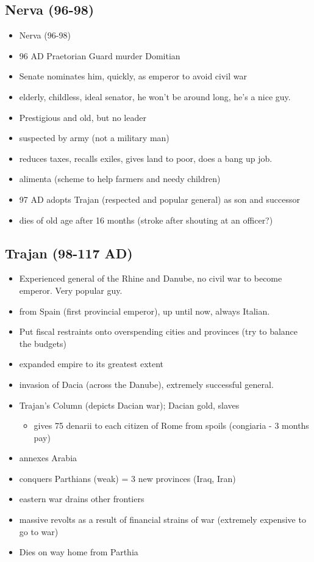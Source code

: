 \documentclass[12pt, twoside]{article}
\begin{document}
\subsection{Nerva (96-98)}
\begin{itemize}
\item Nerva (96-98)
\item 96 AD Praetorian Guard murder Domitian
\item Senate nominates him, quickly, as emperor to avoid civil war
\item elderly, childless, ideal senator, he won't be around long, he's a nice guy.
\item Prestigious and old, but no leader
\item suspected by army (not a military man)
\item reduces taxes, recalls exiles, gives land to poor, does a bang up job.
\item alimenta (scheme to help farmers and needy children)
\item 97 AD adopts Trajan (respected and popular general) as son and successor
\item dies of old age after 16 months (stroke after shouting at an officer?)
\end{itemize}

\subsection{Trajan (98-117 AD)}
\begin{itemize}
\item Experienced general of the Rhine and Danube, no civil war to become emperor.  Very popular guy.
\item from Spain (first provincial emperor), up until now, always Italian.
\item Put fiscal restraints onto overspending cities and provinces (try to balance the budgets)
\item expanded empire to its greatest extent
\item invasion of Dacia (across the Danube), extremely successful general.
\item Trajan's Column (depicts Dacian war); Dacian gold, slaves
	\begin{itemize}
	\item gives 75 denarii to each citizen of Rome from spoils (congiaria - 3 months pay)
	\end{itemize}
\item annexes Arabia
\item conquers Parthians (weak) = 3 new provinces (Iraq, Iran)
\item eastern war drains other frontiers
\item massive revolts as a result of financial strains of war (extremely expensive to go to war)
\item Dies on way home from Parthia
\end{itemize}
\end{document}
